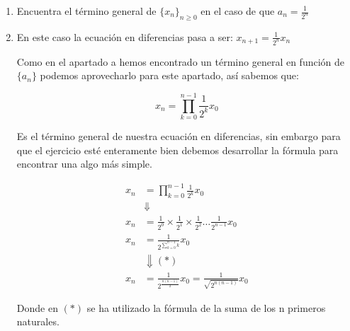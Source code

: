 \documentclass[12pt]{article}
\begin{document}
\begin{ejercicio}[3 puntos]
\begin{enumerate}
        \item Encuentra el término general de $\{x_n\}_{n\geq 0}$ en el caso de que $a_n=\frac{1}{2^n}$\\
        \item 
        En este caso la ecuación en diferencias pasa a ser: $x_{n+1}=\frac{1}{2^n}x_n$
        
        Como en el apartado a hemos encontrado un término general en función de $\{a_n\}$ podemos aprovecharlo para este apartado, así sabemos que:
        
        \[x_n = \prod_{k=0}^{n-1} \frac{1}{2^k}x_0\]
        
        Es el término general de nuestra ecuación en diferencias, sin embargo para que el ejercicio esté enteramente bien debemos desarrollar la fórmula para encontrar una algo más simple.
        
        \begin{align*}
        x_n &= \prod_{k=0}^{n-1} \frac{1}{2^k}x_0\\
        &\Downarrow\\
        x_n &= \frac{1}{2^0}\times\frac{1}{2^1}\times\frac{1}{2^2}\dots\frac{1}{2^{n-1}} x_0\\
        x_n &= \frac{1}{2^{\sum_{k=0}^{n-1}k}}x_0\\
        &\Downarrow (*)\\
        x_n &= \frac{1}{2^{\frac{n(n-1)}{2}}}x_0 = \frac{1}{\sqrt{2^{n(n-1)}}}x_0
        \end{align*}
        
        Donde en $(*)$ se ha utilizado la fórmula de la suma de los n primeros naturales.
        \end{enumerate}
    \end{ejercicio}
\end{document}
